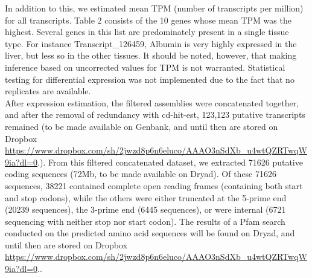 \documentclass[12pt]{article}
\begin{document}
In addition to this, we estimated mean TPM (number of transcripts per million) for all transcripts. {\hypertarget{Table 2}{Table 2}} consists of the 10 genes whose mean TPM was the highest. Several genes in this list are predominately  present in a single tissue type. For instance Transcript\_126459, Albumin is very highly expressed in the liver, but less so in the other tissues. It should be noted, however, that making inference based on uncorrected values for TPM is not warranted. Statistical testing for differential expression was not implemented due to the fact that no replicates are available.  \\  

After expression estimation, the filtered assemblies were concatenated together, and after the removal of redundancy with cd-hit-est, 123,123 putative transcripts remained (to be made available on Genbank, and until then are stored on Dropbox \url{https://www.dropbox.com/sh/2jwzd8p6n6eluco/AAAO3nSdXb_u4wtQZRTwqW9ia?dl=0}.). From this filtered concatenated dataset, we extracted 71626 putative coding sequences (72Mb, to be made available on Dryad). Of these 71626 sequences, 38221 contained complete open reading frames (containing both start and stop codons), while the others were either truncated at the 5-prime end (20239 sequences), the 3-prime end (6445 sequences), or were internal (6721 sequencing with neither stop nor start codon). The results of a Pfam search conducted on the predicted amino acid sequences will be found on Dryad, and until then are stored on Dropbox \url{https://www.dropbox.com/sh/2jwzd8p6n6eluco/AAAO3nSdXb_u4wtQZRTwqW9ia?dl=0}.. \\
\end{document}
